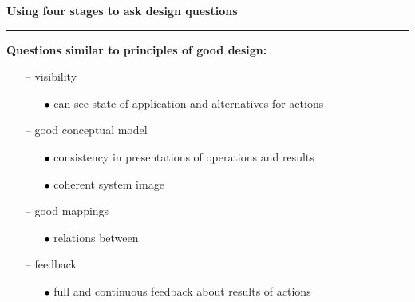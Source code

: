 \documentclass[pdf]{beamer}
\begin{document}
\begin{frame} 
\vspace{8mm}
\textcolor{myBlue}{\textbf{\Large{Using four stages to ask design questions}}}

\textcolor{red}{\rule{10cm}{1mm}}

\textbf{Questions similar to principles of good design:}

	\begin{itemize} 
    	\item[\textcolor{black}{--}] visibility
        \begin{itemize}
        	\item[\textcolor{black}{\tiny$\bullet$}] \small{ can see state of application and alternatives for actions}
        \end{itemize}
        
        \item[\textcolor{black}{--}] good conceptual model
        \begin{itemize}
        	\item[\textcolor{black}{\tiny$\bullet$}] \small{consistency in presentations of operations and results}
            \item[\textcolor{black}{\tiny$\bullet$}] \small{coherent system image}
        \end{itemize}
        
        \item[\textcolor{black}{--}] good mappings
        \begin{itemize}
        	\item[\textcolor{black}{\tiny$\bullet$}] \small{ relations between}
            \begin{itemize}  \end{itemize}
        \end{itemize}
        
        \item[\textcolor{black}{--}] feedback
        \begin{itemize}
        	\item[\textcolor{black}{\tiny$\bullet$}] \small{ full and continuous feedback about results of actions}
		\end{itemize}
  	\end{itemize}
\end{frame}
\end{document}
